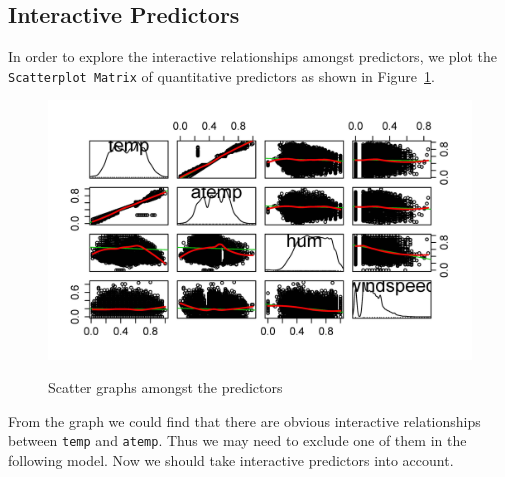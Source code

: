 \subsection{Interactive Predictors}
\label{sec:interactive}
In order to explore the interactive relationships amongst predictors, we plot the \texttt{Scatterplot Matrix} of quantitative predictors as shown in Figure~\ref{fig:interactive}.

\begin{figure}
  \centering
  \includegraphics[width=\linewidth]{pic/interactive.jpg}\\
  \caption{Scatter graphs amongst the predictors}\label{fig:interactive}
\end{figure}
From the graph we could find that there are obvious interactive relationships between \texttt{temp} and \texttt{atemp}. Thus we may need to exclude one of them in the following model.
Now we should take interactive predictors into account.
